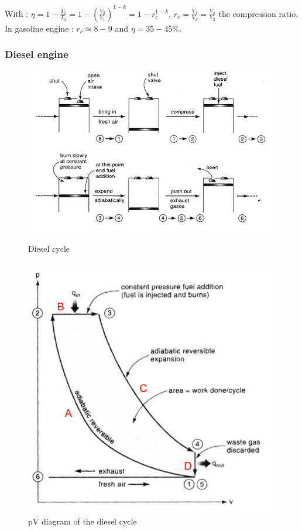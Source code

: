 \documentclass[../main.tex]{subfiles}
\begin{document}
With : $\eta = 1-\frac{T_1}{T_2} = 1- (\frac{V_2}{V_1})^{1-k} = 1-r_c^{1-k}$, $r_c = \frac{V_1}{V_2} = \frac{V_4}{V_3}$ the compression ratio. In gasoline engine : $r_c \simeq 8-9$ and $\eta=35-45\%$.\\

\subsubsection{Diesel engine}

\begin{figure}[hbt!]
\begin{minipage}{.5\textwidth}
    \centering
    \includegraphics[width=\linewidth]{IMAGES/Renewable/Screenshot from 2025-03-04 15-35-05.png}
    \caption{Diesel cycle}
\end{minipage}
\hfill
\begin{minipage}{.5\textwidth}
    \centering
    \includegraphics[width=\linewidth]{IMAGES/Renewable/Screenshot from 2025-03-04 15-38-48.png}
    \caption{pV diagram of the diesel cycle}
\end{minipage}    
\end{figure}
\end{document}
